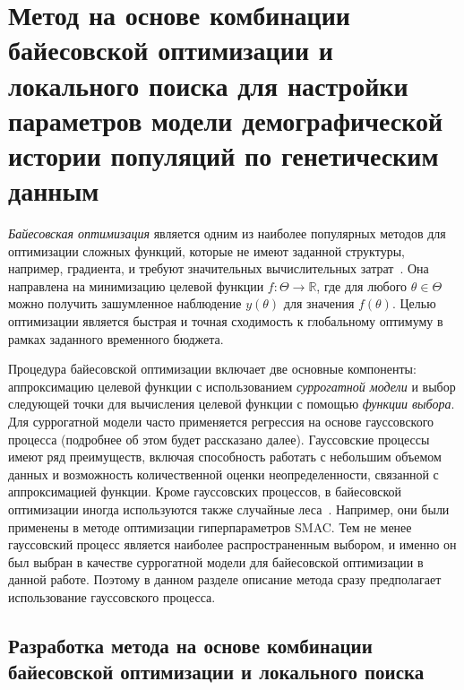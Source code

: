 \FloatBarrier
\section{Метод на основе комбинации байесовской оптимизации и локального поиска для настройки параметров модели демографической истории популяций по генетическим данным}
\label{sec:part2:bayesian_optimization}


\emph{Байесовская оптимизация} является одним из наиболее популярных методов для оптимизации сложных функций, которые не имеют заданной структуры, например, градиента, и требуют значительных вычислительных затрат~\cite{kushner1964new, movckus1975bayesian, mockus1989bayesian}.
Она направлена на минимизацию целевой функции ${f: \Theta \to \mathbb{R}}$, где для любого ${\theta \in \Theta}$ можно получить зашумленное наблюдение $y(\theta)$ для значения $f(\theta)$.
Целью оптимизации является быстрая и точная сходимость к глобальному оптимуму в рамках заданного временного бюджета.

Процедура байесовской оптимизации включает две основные компоненты: аппроксимацию целевой функции с использованием \textit{суррогатной модели} и выбор следующей точки для вычисления целевой функции с помощью \textit{функции выбора}.
Для суррогатной модели часто применяется регрессия на основе гауссовского процесса (подробнее об этом будет рассказано далее). %
Гауссовские процессы имеют ряд преимуществ, включая способность работать с небольшим объемом данных и возможность количественной оценки неопределенности, связанной с аппроксимацией функции.
Кроме гауссовских процессов, в байесовской оптимизации иногда используются также случайные леса~\cite{hutter2011sequential}.
Например, они были применены в методе оптимизации гиперпараметров SMAC.
Тем не менее гауссовский процесс является наиболее распространенным выбором, и именно он был выбран в качестве суррогатной модели для байесовской оптимизации в данной работе.
Поэтому в данном разделе описание метода сразу предполагает использование гауссовского процесса.


\subsection{Разработка метода на основе комбинации байесовской оптимизации и локального поиска} 
\label{sec:part2:bayesian_optimization:development}

